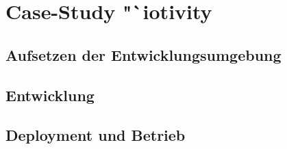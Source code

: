 \chapter{Case-Study "`iotivity}

\section{Aufsetzen der Entwicklungsumgebung}

\section{Entwicklung}

\section{Deployment und Betrieb}